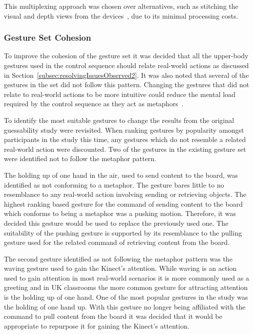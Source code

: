 \documentclass[link]{IWCOMP}
\begin{document}
This multiplexing approach was chosen over alternatives, such as stitching the visual and depth views from the devices~\cite{Dubois2011}, due to its minimal processing costs.

\subsubsection{Gesture Set Cohesion} 
\label{subsubsec:studyImplementationGestureSet}

To improve the cohesion of the gesture set it was decided that all the upper-body gestures used in the control sequence should relate real-world actions as discussed in Section~\ref{subsec:resolvingIssuesObserved2}.
It was also noted that several of the gestures in the set did not follow this pattern.
Changing the gestures that did not relate to real-world actions to be more intuitive could reduce the mental load required by the control sequence as they act as metaphors~\cite{Wang2008}.

To identify the most suitable gestures to change the results from the original guessability study were revisited.
When ranking gestures by popularity amongst participants in the study this time, any gestures which do not resemble a related real-world action were discounted.
Two of the gestures in the existing gesture set were identified not to follow the metaphor pattern.

The holding up of one hand in the air, used to send content to the board, was identified as not conforming to a metaphor.
The gesture bares little to no resemblance to any real-world action involving sending or retrieving objects.
The highest ranking based gesture for the command of sending content to the board which conforms to being a metaphor was a pushing motion.
Therefore, it was decided this gesture would be used to replace the previously used one.
The suitability of the pushing gesture is supported by its resemblance to the pulling gesture used for the related command of retrieving content from the board.

The second gesture identified as not following the metaphor pattern was the waving gesture used to gain the Kinect's attention.
While waving is an action used to gain attention in most real-world scenarios it is more commonly used as a greeting and in UK classrooms the more common gesture for attracting attention is the holding up of one hand.
One of the most popular gestures in the study was the holding of one hand up.
With this gesture no longer being affiliated with the command to pull content from the board it was decided that it would be appropriate to repurpose it for gaining the Kinect's attention.
\end{document}
